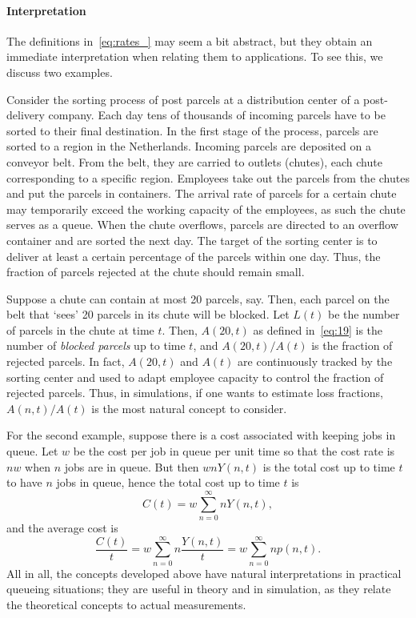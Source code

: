 \paragraph{Interpretation}

The definitions in~\cref{eq:rates_} may seem a bit abstract, but they obtain an immediate interpretation when relating them to applications.
To see this, we discuss two examples.

Consider the sorting process of post parcels at a distribution center of a post-delivery company.
Each day tens of thousands of incoming parcels have to be sorted to their final destination.
In the first stage of the process, parcels are sorted to a region in the Netherlands.
Incoming parcels are deposited on a conveyor belt.
From the belt, they are carried to outlets (chutes), each chute corresponding to a specific region.
Employees take out the parcels from the chutes and put the parcels in containers.
The arrival rate of parcels for a certain chute may temporarily exceed the working capacity of the employees, as such the chute serves as a queue.
When the chute overflows, parcels are directed to an overflow container and are sorted the next day.
The target of the sorting center is to deliver at least a certain percentage of the parcels within one day.
Thus, the fraction of parcels rejected at the chute should remain small.

Suppose a chute can contain at most 20 parcels, say.
Then, each parcel on the belt that `sees' 20 parcels in its chute will be blocked.
Let $L(t)$ be the number of parcels in the chute at time $t$.
Then, $A(20,t)$ as defined in~\cref{eq:19} is the number of\emph{ blocked parcels} up to time $t$, and $A(20,t)/A(t)$ is the fraction of rejected parcels.
In fact, $A(20,t)$ and $A(t)$ are continuously tracked by the sorting center and used to adapt employee capacity to control the fraction of rejected parcels.
Thus, in simulations, if one wants to estimate loss fractions, $A(n,t)/A(t)$ is the most natural concept to consider.

For the second example, suppose there is a cost associated with keeping jobs in queue.
Let $w$ be the cost per job in queue per unit time so that the cost rate is $n w$ when $n$ jobs are in queue.
But then $ w n Y(n,t)$ is the total cost up to time $t$ to have $n$ jobs in queue, hence the total cost up to time $t$ is
 \begin{equation*}
C(t) = w \sum_{n=0}^\infty n Y(n,t),
 \end{equation*}
and the average cost is
\begin{equation*}
\frac{C(t)}t = w \sum_{n=0}^\infty n \frac{Y(n,t)}t = w \sum_{n=0}^\infty n p(n,t).
\end{equation*}
All in all, the concepts developed above have natural interpretations
in practical queueing situations; they are useful in theory and in
simulation, as they relate the theoretical concepts to actual measurements.



